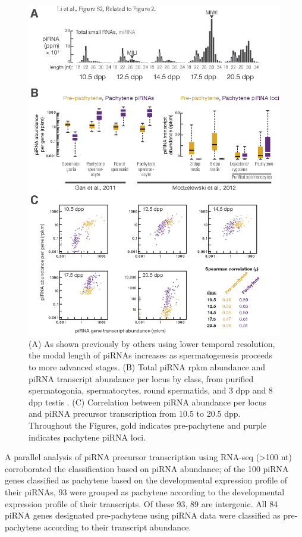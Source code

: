     \begin{figure}\tiny %
      \centering 
      \includegraphics{Figures/MolCel/MolCel2013_FigS2.eps}
      \caption[Pre-pachytene piRNAs Persist in Pachytene Spermatocytes]
      {
     	 (A) As shown previously by others using lower temporal resolution, the modal length of piRNAs increases as spermatogenesis proceeds to more advanced stages. (B) Total piRNA rpkm abundance and piRNA transcript abundance per locus by class, from purified spermatogonia, spermatocytes, round spermatids, and 3 dpp and 8 dpp testis \citep{Gan2011, Modzelewski2012}. (C) Correlation between piRNA abundance per locus and piRNA precursor transcription from 10.5 to 20.5 dpp. Throughout the Figures, gold indicates pre-pachytene and purple indicates pachytene piRNA loci.
     	 }
      \label{MolCel:fig:MolCelS2}
      \end{figure}

    A parallel analysis of piRNA precursor transcription using RNA-seq (>100 nt) corroborated the classification based on piRNA abundance; of the 100 piRNA genes classified as pachytene based on the developmental expression profile of their piRNAs, 93 were grouped as pachytene according to the developmental expression profile of their transcripts. Of these 93, 89 are intergenic. All 84 piRNA genes designated pre-pachytene using piRNA data were classified as pre-pachytene according to their transcript abundance.

